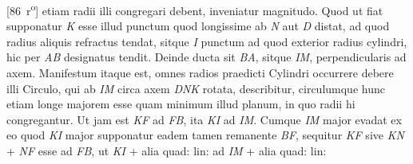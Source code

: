 [86~r\textsuperscript{o}] etiam radii illi congregari debent, inveniatur magnitudo. Quod ut fiat supponatur \textit{K} esse illud punctum quod  longissime ab \textit{N} aut \textit{D} distat, ad quod radius aliquis refractus  tendat, sitque \textit{I} punctum ad quod exterior radius cylindri, hic  per \textit{AB} designatus tendit. Deinde ducta sit \textit{BA}, sitque \textit{IM},  perpendicularis ad axem. Manifestum itaque est, omnes  radios praedicti Cylindri occurrere debere illi Circulo, qui ab \textit{IM} circa axem \textit{DNK} rotata, describitur, circulumque  hunc etiam longe majorem esse quam minimum illud planum,  in quo radii hi congregantur. Ut jam est \textit{KF} ad \textit{FB}, ita \textit{KI} ad \textit{IM}. Cumque \textit{IM} major evadat ex eo quod \textit{KI}  major supponatur eadem tamen remanente \textit{BF}, sequitur \textit{KF} sive \textit{KN} + \textit{NF} esse ad \textit{FB}, ut \textit{KI} + alia quad: lin: ad \textit{IM} + alia quad: lin:\rule[-9mm]{0mm}{9mm}\\
 \renewcommand{\arraystretch}{2.3}
